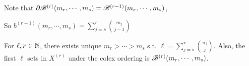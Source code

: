 \documentclass[a4paper]{article}
\begin{document}
Note that $\partial\mathscr{B}^{(r)}(m_r,\cdots,m_s)=\mathscr{B}^{(r-1)}(m_r,\cdots,m_s)$,

So $b^{(r-1)}(m_r,\cdots,m_s)=\sum_{j=s}^{r}\binom{m_j}{j-1}$

\begin{lemma-num}
	For $\ell,r\in\mathbb{N}$, there exists unique $m_r>\cdots >m_s$ s.t. $\ell=\sum_{j=s}^r\binom{n_j}{j}$. Also, the first $\ell$ sets in $X^{(r)}$ under the colex ordering is $\mathscr{B}^{(r)}(m_r,\cdots,m_s)$.
\end{lemma-num}

\printindex
\end{document}
